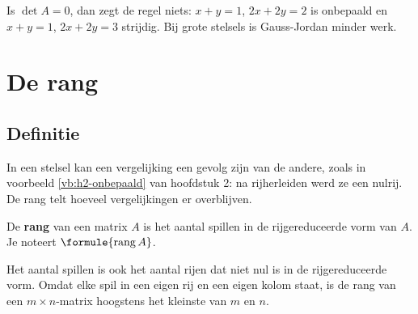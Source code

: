 Is $\det A = 0$, dan zegt de regel niets: $x + y = 1$, $2x + 2y = 2$ is onbepaald en $x + y = 1$, $2x + 2y = 3$ strijdig. Bij grote stelsels is Gauss-Jordan minder werk.

\begin{oefeningen}
\end{oefeningen}

\section{De rang}

\subsection{Definitie}

In een stelsel kan een vergelijking een gevolg zijn van de andere, zoals in voorbeeld \ref{vb:h2-onbepaald} van hoofdstuk 2: na rijherleiden werd ze een nulrij. De rang telt hoeveel vergelijkingen er overblijven.

\begin{theorie}
De \textbf{\textcolor{accent}{rang}} van een matrix $A$ is het aantal spillen in de rijgereduceerde vorm van $A$. Je noteert $\formule{\operatorname{rang} A}$.
\end{theorie}

Het aantal spillen is ook het aantal rijen dat niet nul is in de rijgereduceerde vorm. Omdat elke spil in een eigen rij en een eigen kolom staat, is de rang van een $m \times n$-matrix hoogstens het kleinste van $m$ en $n$.

